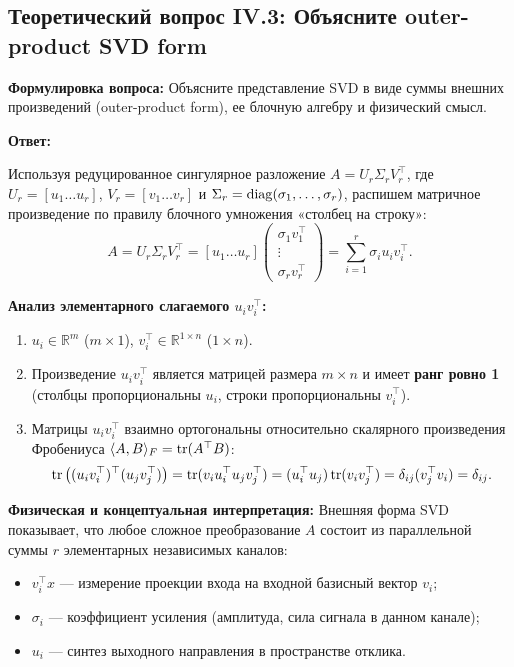 
\subsection{Теоретический вопрос IV.3: Объясните outer-product SVD form}
\textbf{Формулировка вопроса:} Объясните представление SVD в виде суммы внешних произведений (outer-product form), ее
блочную алгебру и физический смысл.

\textbf{Ответ:}

Используя редуцированное сингулярное разложение $A = U_r \Sigma_r V_r^\top$, где $U_r = [u_1 \dots u_r]$, $V_r = [v_1
\dots v_r]$ и $\Sigma_r = \operatorname{diag}(\sigma_1, \dots, \sigma_r)$, распишем матричное произведение по правилу блочного
умножения «столбец на строку»:
\[ A = U_r \Sigma_r V_r^\top = [u_1 \dots u_r] \begin{pmatrix}
                                                           \sigma_1 v_1^\top \\ \vdots \\ \sigma_r v_r^\top
\end{pmatrix} = \sum_{i=1}^r \sigma_i u_i v_i^\top. \]

\textbf{Анализ элементарного слагаемого $u_i v_i^\top$:}
\begin{enumerate}
    \item $u_i \in \mathbb{R}^m$ ($m \times 1$), $v_i^\top \in \mathbb{R}^{1 \times n}$ ($1 \times n$).
    \item Произведение $u_i v_i^\top$ является матрицей размера $m \times n$ и имеет
    \textbf{ранг ровно 1} (столбцы пропорциональны $u_i$, строки пропорциональны $v_i^\top$).
    \item Матрицы $u_i v_i^\top$ взаимно ортогональны относительно скалярного произведения Фробениуса $\langle A, B
    \rangle_F = \operatorname{tr}(A^\top B)$:
    \[ \operatorname{tr}\left((u_i v_i^\top)^\top (u_j v_j^\top)\right) = \operatorname{tr}(v_i u_i^\top u_j v_j^\top) = (u_i^\top u_j)
    \operatorname{tr}(v_i v_j^\top) = \delta_{ij} (v_j^\top v_i) = \delta_{ij}. \]
\end{enumerate}

\textbf{Физическая и концептуальная интерпретация:} Внешняя форма SVD показывает, что любое сложное преобразование $A$
состоит из параллельной суммы $r$ элементарных независимых каналов:
\begin{itemize}
    \item $v_i^\top x$ — измерение проекции входа на входной базисный вектор $v_i$;
    \item $\sigma_i$ — коэффициент усиления (амплитуда, сила сигнала в данном канале);
    \item $u_i$ — синтез выходного направления в пространстве отклика.
\end{itemize}

\newpage

